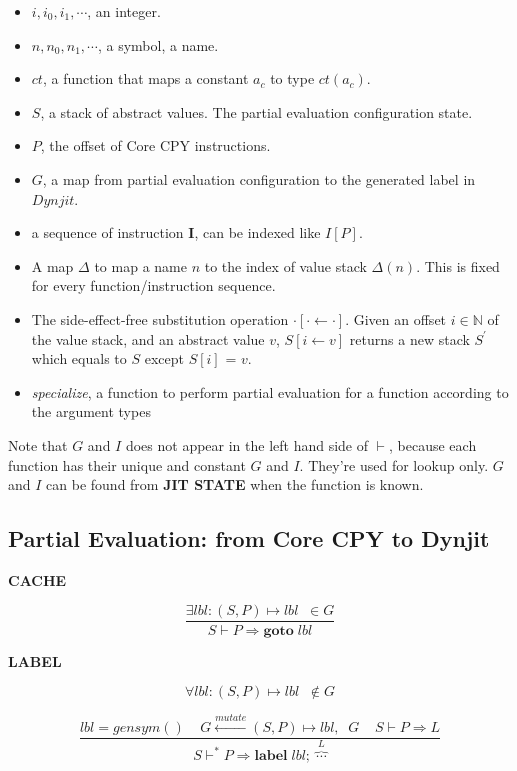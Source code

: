 \documentclass[12pt, a4paper]{report}
\newcommand{\rulegroup}[1]{
    \textbf{#1}
}
\newcommand{\gap}{ \;\;\;\; }
\begin{document}
\begin{itemize}
    \item $i, i_0, i_1, \cdots$, an integer.
    \item $n, n_0, n_1, \cdots$, a symbol, a name.
    \item $ct$, a function that maps a constant $a_c$ to type $ct(a_c)$.
    \item $S$, a stack of abstract values. The partial evaluation configuration state.
    \item $P$, the offset of Core CPY instructions.
    \item $G$, a map from partial evaluation configuration to the generated label in $Dynjit$.
    \item a sequence of instruction $\mathbf{I}$, can be indexed like $I[P]$.
    \item A map $\Delta$ to map a name $n$ to the index of value stack $\Delta(n)$. This is fixed for every function/instruction sequence.
    \item The side-effect-free substitution operation $\cdot[\cdot \leftarrow \cdot]$.
          Given an offset $i \in \mathbb{N}$ of the value stack, and an abstract value $v$,
          $S[i \leftarrow v]$ returns a new stack $S^{'}$ which equals to $S$ except $S[i]$ = $v$.
    \item \textit{specialize}, a function to perform partial evaluation for a function according to the argument types
\end{itemize}

Note that $G$ and $I$ does not appear in the left hand side of $\vdash$, because each function has their unique and constant $G$ and $I$.
They're used for lookup only. $G$ and $I$ can be found from \textbf{JIT STATE} when the function is known.

\subsection*{Partial Evaluation: from Core CPY to Dynjit}

\hrulefill
\bigbreak

\rulegroup{CACHE}
$$
\dfrac{
    \exists \mathit{lbl} : (S, P) \mapsto \mathit{lbl} \; \; \in G
}{
    S \vdash P \Rightarrow \mathbf{goto} \; \mathit{lbl}
}
$$

\rulegroup{LABEL}

$$
\forall \mathit{lbl} : (S, P) \mapsto \mathit{lbl} \;\; \notin G
$$

\vspace*{-\baselineskip}
$$
\dfrac{
    \mathit{lbl} = gensym()
    \gap
    G \overset{mutate}{\leftarrow} (S, P) \mapsto \mathit{lbl}, \;\;  G
    \gap
    S \vdash P \Rightarrow L
}{
    S \vdash^{*} P \Rightarrow \mathbf{label} \; \mathit{lbl} ; \; \overbrace{\cdots}^{L}
}
$$
\end{document}
